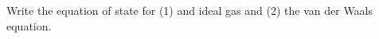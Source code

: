 

\vspace*{\fill}
\centering

Write the equation of state for (1) and ideal gas and (2) the van der Waals equation.

\centering
\vspace*{\fill}

